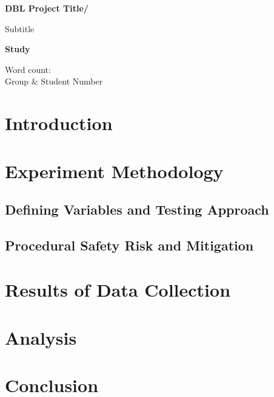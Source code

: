 \documentclass[a4paper,12pt]{extarticle}
\begin{document}
\begin{titlepage}
    \begin{center}
        \vspace*{1cm}
            
        \Huge
        \textbf{DBL Project Title/}
            
        \vspace{1cm}
        \LARGE
        Subtitle
        \vspace{4cm}
            
        \textbf{Study}
            
        \vfill
        
        \Large
        Word count:\\
        Group \& Student Number\\
    \end{center}
\end{titlepage}

\tableofcontents
\newpage

\section{Introduction}

\section{Experiment Methodology}

\subsection{Defining Variables and Testing Approach}

\subsection{Procedural Safety Risk and Mitigation}

\section{Results of Data Collection}

\section{Analysis}

\section{Conclusion}
\end{document}
